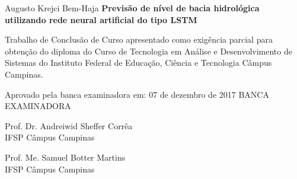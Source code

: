 \begin{folhadeaprovacao}
\linespread{1.5}

  \begin{center}
    {\chapterfont Augusto Krejci Bem-Haja}
    \vfill\vspace{2cm}
    {\chapterfont\bfseries Previsão de nível de bacia hidrológica utilizando rede neural artificial do tipo LSTM}
    \vfill\vspace{1.5cm}
    \end{center}
    
    \hspace{.45\textwidth}
    \begin{minipage}{.47\linewidth}
	\vfill	
	Trabalho de Conclus\~{a}o de Curso apresentado como exig\^encia parcial para obten\c{c}\~{a}o do diploma do Curso de Tecnologia em An\'{a}lise e Desenvolvimento de Sistemas do Instituto Federal de Educa\c{c}\~{a}o, Ci\^{e}ncia e Tecnologia C\^{a}mpus Campinas.
    \end{minipage}
\vfill\vspace{1cm}  

\begin{center}
Aprovado pela banca examinadora em: 07 de dezembro de 2017
\vfill \vspace{1cm}
{\large BANCA EXAMINADORA}
   \vspace{1cm}
   
	Prof. Dr. Andreiwid Sheffer Corrêa \\
    IFSP Câmpus Campinas
   
   \vspace{1.6cm}
   
   Prof. Me. Samuel Botter Martins \\
   IFSP Câmpus Campinas
\end{center}
\end{folhadeaprovacao}
